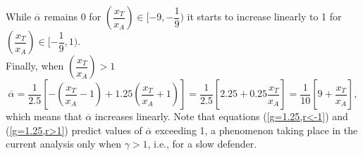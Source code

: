 While $\overline{\alpha}$ remains 0 for $(\dfrac{x_T}{x_A})\in [-9,-\dfrac{1}{9})$ it starts to increase linearly to 1 for $(\dfrac{x_T}{x_A})\in[-\dfrac{1}{9},1)$.\\


Finally, when $(\dfrac{x_T}{x_A})>1$
\begin{equation}
\overline{\alpha}=\dfrac{1}{2.5}[-(\dfrac{x_T}{x_A}-1)+ 1.25 (\dfrac{x_T}{x_A}+1)] = \dfrac{1}{2.5}[2.25+0.25 \dfrac{x_T}{x_A}]=\dfrac{1}{10}[9+\dfrac{x_T}{x_A}],
\label{g=1.25,r>1}
\end{equation}
which means that $\overline{\alpha}$ increases linearly. Note that equations (\ref{g=1.25,r<-1}) and (\ref{g=1.25,r>1}) predict values of $\overline{\alpha}$ exceeding 1, a phenomenon taking place in the current analysis only when $\gamma>1$, i.e., for a slow defender. 


%
%
